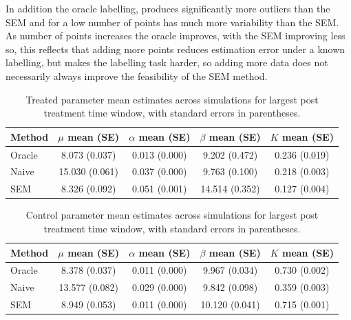 \documentclass{statsoc}
\newcommand{\1}{\mathbbm{1}}
\begin{document}
In addition the oracle labelling, produces significantly more outliers than the SEM and for a low number of points has much more variability than the SEM. As number of points increases the oracle improves, with the SEM improving less so, this reflects that adding more points reduces estimation error under a known labelling, but makes the labelling task harder, so adding more data does not necessarily always improve the feasibility of the SEM method.

\begin{table}
\centering
\begin{minipage}{\textwidth}
\centering
\begin{tabular}{lcccc}
\toprule
Method & $\mu$ mean (SE) & $\alpha$ mean (SE) & $\beta$ mean (SE) & $K$ mean (SE) \\
\midrule
Oracle & 8.073 (0.037) & 0.013 (0.000) & 9.202 (0.472) & 0.236 (0.019) \\
Naive  & 15.030 (0.061) & 0.037 (0.000) & 9.763 (0.100) & 0.218 (0.003) \\
SEM    & 8.326 (0.092) & 0.051 (0.001) & 14.514 (0.352) & 0.127 (0.004) \\
\bottomrule
\end{tabular}
\caption{Treated parameter mean estimates across simulations for largest post treatment time window, with standard errors in parentheses.}
\label{tab:treated_params_summary}
\end{minipage}
\end{table}

\begin{table}
\centering
\begin{minipage}{\textwidth}
\centering
\begin{tabular}{lcccc}
\toprule
Method & $\mu$ mean (SE) & $\alpha$ mean (SE) & $\beta$ mean (SE) & $K$ mean (SE) \\
\midrule
Oracle & 8.378 (0.037) & 0.011 (0.000) & 9.967 (0.034) & 0.730 (0.002) \\
Naive  & 13.577 (0.082) & 0.029 (0.000) & 9.842 (0.098) & 0.359 (0.003) \\
SEM    & 8.949 (0.053) & 0.011 (0.000) & 10.120 (0.041) & 0.715 (0.001) \\
\bottomrule
\end{tabular}
\caption{Control parameter mean estimates across simulations for largest post treatment time window, with standard errors in parentheses.}
\label{tab:control_params_summary}
\end{minipage}
\end{table}
\end{document}
